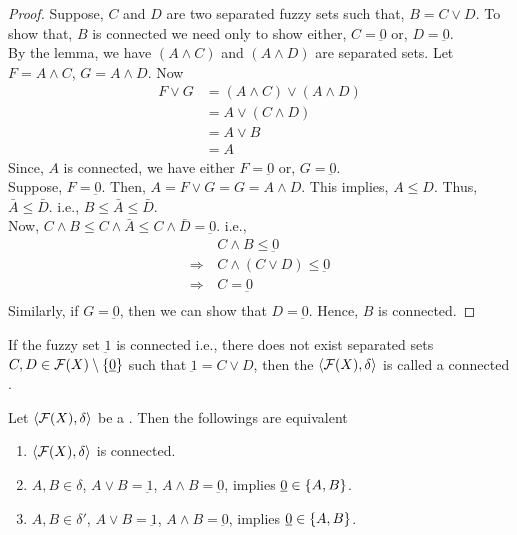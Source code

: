 \documentclass[../main-sheet.tex]{subfiles}
\begin{document}
\begin{proof}
    Suppose, \(C \) and \(D \) are two separated fuzzy sets such that, \(B=C\vee D \). To show that, \(B \) is connected we need only to show either, \(C=\underbar{0}\) or, \(D=\underbar{0}\).\\
    By the lemma, we have \((A\wedge C )\) and \((A\wedge D )\) are separated sets. Let \(F=A\wedge C \), \(G=A\wedge D \). Now
    \begin{align*}
        F\vee G&=(A\wedge C)\vee (A\wedge D)\\
        &=A\vee (C\wedge D)\\
        &=A\vee B\\
        &=A
    \end{align*}
    Since, \(A \) is connected, we have either \(F=\underbar{0}\) or, \(G=\underbar{0}\).\\
    Suppose, \(F=\underbar{0}\). Then, \(A=F\vee G =G =A\wedge D    \). This implies, \(A\leq D\). Thus, \(\bar{A }\leq \bar{ D }\). i.e., \(B\leq\bar{A }\leq \bar{D }\).\\
    Now, \(C\wedge B\leq C\wedge\bar{A }\leq C\wedge \bar{D }=\underbar{0}\). i.e., \begin{align*}
        &C\wedge B\leq \underbar{0}\\
        \Rightarrow\,&C\wedge (C\vee D) \leq \underbar{0}\\
        \Rightarrow\,&C= \underbar{0}\\
    \end{align*}
    Similarly, if \(G=\underbar{0}\), then we can show that \(D=\underbar{0}\). Hence, \(B \) is connected.
\end{proof}
\begin{defn}
    If the fuzzy set \(\underbar{1}\) is connected i.e., there does not exist separated sets \(C, D\in\mathcal{F}(X)\setminus\{\underbar{0}\}\) such that \(\underbar{1}=C \vee D \), then the \fts \(\langle \mathcal{F}(X), \delta \rangle\) is called a connected \fts.
\end{defn}
\begin{thm}
    Let \(\langle \mathcal{F}(X), \delta \rangle\) be a \fts. Then the followings are equivalent
    \begin{enumerate}
        \item \(\langle \mathcal{F}(X), \delta \rangle\) is connected.
        \item \(A,B \in \delta\), \(A\vee B=\underbar{1}\), \(A\wedge B=\underbar{0}\), implies \(\underbar{0}\in\left\{A,B\right\}\).
        \item \(A,B \in \delta'\), \(A\vee B=\underbar{1}\), \(A\wedge B=\underbar{0}\), implies \(\underbar{0}\in\left\{A,B\right\}\).
    \end{enumerate}
\end{thm}
\end{document}
